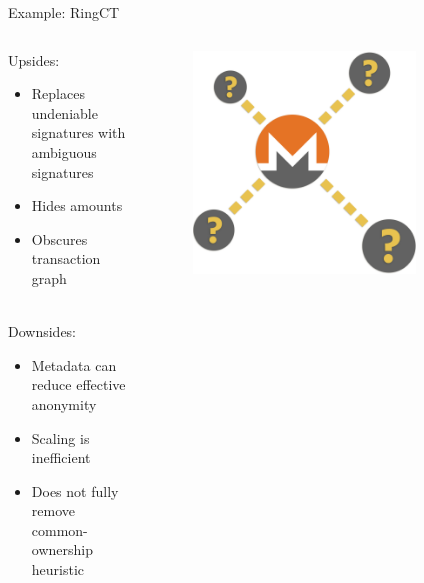 \documentclass[aspectratio=169]{beamer}
\begin{document}
\begin{frame}{Example: RingCT}
\begin{columns}
\begin{column}{0.7\textwidth}
Upsides:
\begin{itemize}
\item Replaces undeniable signatures with ambiguous signatures
\item Hides amounts
\item Obscures transaction graph \\~\\
\end{itemize}

Downsides:
\begin{itemize}
\item Metadata can reduce effective anonymity
\item Scaling is inefficient
\item Does not fully remove common-ownership heuristic
\end{itemize}
\end{column}
\begin{column}{0.3\textwidth}
\begin{figure}
\includegraphics[width=0.8\textwidth]{ambiguous.png}
\end{figure}
\end{column}
\end{columns}
\end{frame}
\end{document}

